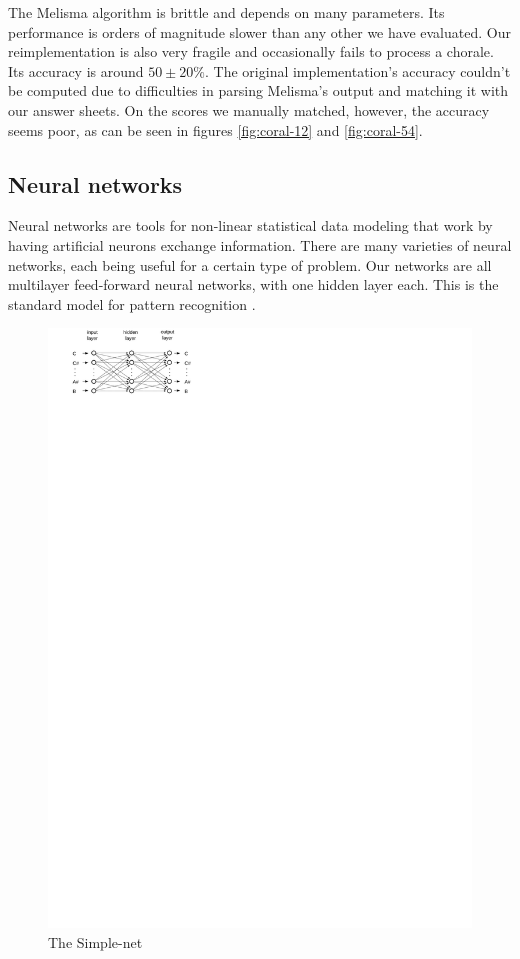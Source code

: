 \documentclass{article}
\begin{document}
The Melisma algorithm is brittle and depends on many parameters. Its
performance is orders of magnitude slower than any other we have
evaluated. Our reimplementation is also very fragile and occasionally
fails to process a chorale. Its accuracy is around $50 \pm 20\%$. The
original implementation's accuracy couldn't be computed due to
difficulties in parsing Melisma's output and matching it with our
answer sheets.  On the scores we manually matched, however, the
accuracy seems poor, as can be seen in figures \ref{fig:coral-12} and
\ref{fig:coral-54}.

\subsection{Neural networks}
\label{sec:neural-nets}

Neural networks are tools for non-linear statistical data
modeling that work by having artificial neurons exchange
information. There are many varieties of neural networks, each being
useful for a certain type of problem. Our networks are all multilayer
feed-forward neural networks, with one hidden layer each. This is the
standard model for pattern recognition \cite{russell.ea:artificial}.

\begin{figure}
  \includegraphics[]{neural-networks}
  \caption{The Simple-net}
  \label{fig:simple-net-diagram}
\end{figure}
\end{document}
